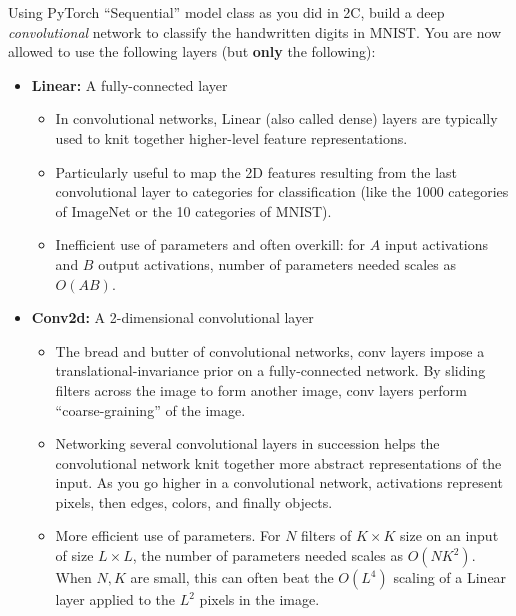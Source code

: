 Using PyTorch ``Sequential'' model class as you did in 2C, build a deep \emph{convolutional}
network to classify the handwritten digits in MNIST. You are now allowed to use
the following layers (but \textbf{only} the following):

 \begin{itemize}
  \item \textbf{Linear:} A fully-connected layer
  \begin{itemize}
    \item In convolutional networks, Linear (also called dense) layers are typically used to knit together higher-level feature representations.
    \item Particularly useful to map the 2D features resulting from the last convolutional layer to categories for classification (like the 1000 categories of ImageNet or the 10 categories of MNIST).
    \item Inefficient use of parameters and often overkill: for $A$ input activations and $B$ output activations, number of parameters needed scales as $O(AB)$.
  \end{itemize}
  \item \textbf{Conv2d:} A 2-dimensional convolutional layer
  \begin{itemize}
    \item The bread and butter of convolutional networks, conv layers impose a translational-invariance prior on a fully-connected network. By sliding filters across the image to form another image, conv layers perform ``coarse-graining'' of the image.
    \item Networking several convolutional layers in succession helps the convolutional network knit together more abstract representations of the input. As you go higher in a convolutional network, activations represent pixels, then edges, colors, and finally objects.
    \item More efficient use of parameters. For $N$ filters of $K \times K$ size on an input of size $L \times L$, the number of parameters needed scales as $O(N K^2)$. When $N, K$ are small, this can often beat the $O(L^4)$ scaling of a Linear layer applied to the $L^2$ pixels in the image.


\end{itemize}
\end{itemize}
